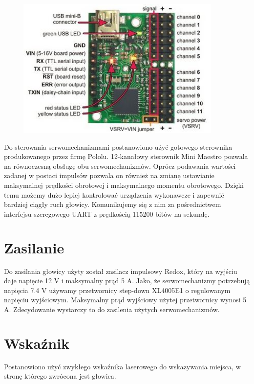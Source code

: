 \begin{figure}[h]
	\centering
	\includegraphics[width=4in]{maestro.jpg}
\end{figure}

Do sterowania serwomechanizmami postanowiono użyć gotowego sterownika produkowanego przez firmę Pololu. 12-kanałowy sterownik Mini Maestro pozwala na równoczesną obsługę obu serwomechanizmów. Oprócz podawania wartości zadanej w postaci impulsów pozwala on również na zmianę ustawianie maksymalnej prędkości obrotowej i maksymalnego momentu obrotowego. Dzięki temu możemy dużo lepiej kontrolować urządzenia wykonawcze i zapewnić bardziej ciągły ruch głowicy. Komunikujemy się z nim za pośrednictwem interfejsu szeregowego UART z prędkością 115200 bitów na sekundę.

\section{Zasilanie}
\label{sec:zasilanie}
Do zasilania głowicy użyty został zasilacz impulsowy Redox, który na wyjściu daje napięcie 12 V i maksymalny prąd 5 A. Jako, że serwomechanizmy potrzebują napięcia 7.4 V używamy przetwornicy step-down XL4005E1 o regulowanym napięciu wyjściowym. Maksymalny prąd wyjściowy użytej przetwornicy wynosi 5 A. Zdecydowanie wystarczy to do zasilenia użytych serwomechanizmów.

\section{Wskaźnik}
\label{sec:wskaznik}

Postanowiono użyć zwykłego wskaźnika laserowego do wskazywania miejsca, w stronę którego zwrócona jest głowica.